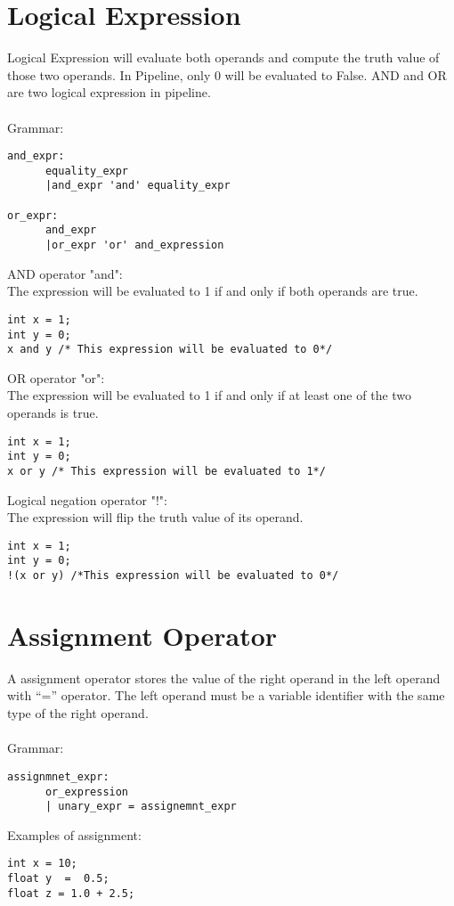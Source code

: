 \documentclass[./LRM_main.tex]{subfiles}
\begin{document}
\section{Logical Expression}
Logical Expression will evaluate both operands and compute the truth value of those two operands. In Pipeline, only 0 will be evaluated to False. AND and OR are two logical expression in pipeline.\\
\vspace{1 mm}\\
Grammar:
\begin{lstlisting}
and_expr:
      equality_expr
      |and_expr 'and' equality_expr

or_expr:
      and_expr
      |or_expr 'or' and_expression

\end{lstlisting}
AND operator "and":\\
The expression will be evaluated to 1 if and only if both operands are true.
\begin{lstlisting}
int x = 1;
int y = 0;
x and y /* This expression will be evaluated to 0*/
\end{lstlisting}
OR operator "or":\\
The expression will be evaluated to 1 if and only if at least one of the two operands is true.
\begin{lstlisting}
int x = 1;
int y = 0;
x or y /* This expression will be evaluated to 1*/
\end{lstlisting}
Logical negation operator "!":\\
The expression will flip the truth value of its operand.
\begin{lstlisting}
int x = 1;
int y = 0;
!(x or y) /*This expression will be evaluated to 0*/
\end{lstlisting}
\section{Assignment Operator}
A assignment operator stores the value of the right operand in the left operand with “=” operator. The left operand must be a variable identifier with the same type of the right operand.\\
\vspace{1 mm}\\
Grammar:
\begin{lstlisting}
assignmnet_expr:
      or_expression
      | unary_expr = assignemnt_expr

\end{lstlisting}
\vspace{1 mm}
Examples of assignment:
\begin{lstlisting}
int x = 10; 
float y  =  0.5;  
float z = 1.0 + 2.5;
\end{lstlisting}	
\end{document}
